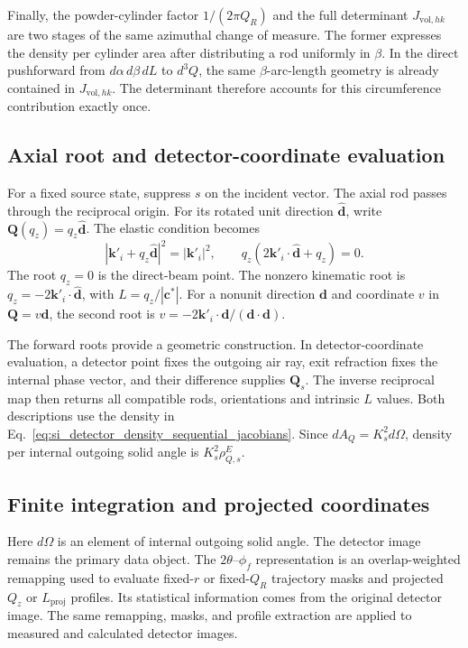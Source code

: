 Finally, the powder-cylinder factor $1/(2\pi Q_R)$ and the full determinant $J_{\mathrm{vol},hk}$ are two stages of the same azimuthal change of measure. The former expresses the density per cylinder area after distributing a rod uniformly in $\beta$. In the direct pushforward from $d\alpha\,d\beta\,dL$ to $d^3Q$, the same $\beta$-arc-length geometry is already contained in $J_{\mathrm{vol},hk}$. The determinant therefore accounts for this circumference contribution exactly once.

\subsection{Axial root and detector-coordinate evaluation}

For a fixed source state, suppress $s$ on the incident vector. The axial rod passes through the reciprocal origin. For its rotated unit direction $\hat{\mathbf d}$, write $\mathbf Q(q_z)=q_z\hat{\mathbf d}$. The elastic condition becomes
\begin{equation}
|\mathbf k'_i+q_z\hat{\mathbf d}|^2=|\mathbf k'_i|^2,
\qquad q_z(2\mathbf k'_i\cdot\hat{\mathbf d}+q_z)=0.
\label{eq:si_axial_ewald_roots}
\end{equation}
The root $q_z=0$ is the direct-beam point. The nonzero kinematic root is $q_z=-2\mathbf k'_i\cdot\hat{\mathbf d}$, with $L=q_z/|\mathbf c^*|$. For a nonunit direction $\mathbf d$ and coordinate $v$ in $\mathbf Q=v\mathbf d$, the second root is $v=-2\mathbf k'_i\cdot\mathbf d/(\mathbf d\cdot\mathbf d)$.

The forward roots provide a geometric construction. In detector-coordinate evaluation, a detector point fixes the outgoing air ray, exit refraction fixes the internal phase vector, and their difference supplies $\mathbf Q_s$. The inverse reciprocal map then returns all compatible rods, orientations and intrinsic $L$ values. Both descriptions use the density in Eq.~\eqref{eq:si_detector_density_sequential_jacobians}. Since $dA_Q=K_s^2d\Omega$, density per internal outgoing solid angle is $K_s^2\rho_{Q,s}^E$.

\subsection{Finite integration and projected coordinates}
\label{subsec:si_projection_uncertainty}

Here $d\Omega$ is an element of internal outgoing solid angle. The detector image remains the primary data object. The $2\theta$--$\phi_f$ representation is an overlap-weighted remapping used to evaluate fixed-$r$ or fixed-$Q_R$ trajectory masks and projected $Q_z$ or $L_{\mathrm{proj}}$ profiles. Its statistical information comes from the original detector image. The same remapping, masks, and profile extraction are applied to measured and calculated detector images.

